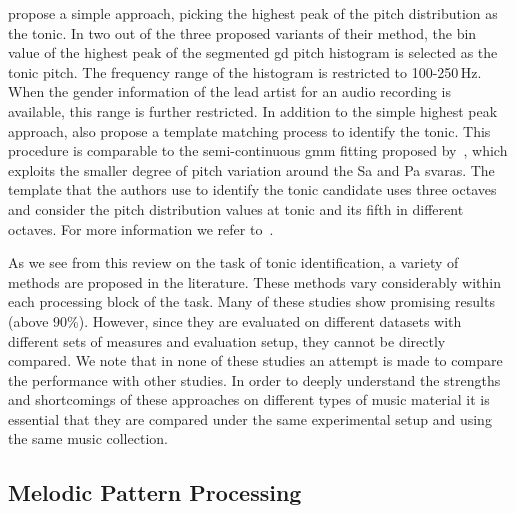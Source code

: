 \cite{bellur2012knowledge} propose a simple approach, picking the highest peak of the pitch distribution as the tonic. In two out of the three proposed variants of their method, the bin value of the highest peak of the segmented \gls{gd} pitch histogram is selected as the tonic pitch. The frequency range of the histogram is restricted to 100-250\,Hz. When the gender information of the lead artist for an audio recording is available, this range is further restricted. In addition to the simple highest peak approach, \cite{bellur2012knowledge} also propose a template matching process to identify the tonic. This procedure is comparable to the semi-continuous \acrshort{gmm} fitting proposed by~\cite{ranjani2011carnatic}, which exploits the smaller degree of pitch variation around the Sa and Pa \glspl{svara}. The template that the authors use to identify the tonic candidate uses three octaves and consider the pitch distribution values at tonic and its fifth in different octaves. For more information we refer to~\cite{Gulati2014Tonic}.

As we see from this review on the task of tonic identification, a variety of methods are proposed in the literature. These methods vary considerably within each processing block of the task. Many of these studies show promising results (above 90\%). However, since they are evaluated on different datasets with different sets of measures and evaluation setup, they cannot be directly compared. We note that in none of these studies an attempt is made to compare the performance with other studies. In order to deeply understand the strengths and shortcomings of these approaches on different types of music material it is essential that they are compared under the same experimental setup and using the same music collection. 


\subsection{Melodic Pattern Processing}
\label{sec:sota_pattern_processing_iam}

